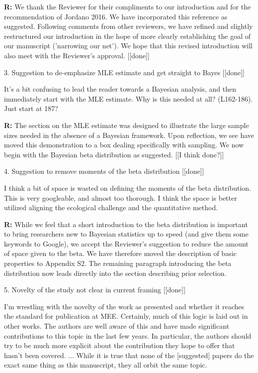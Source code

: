 \documentclass[12pt]{letter}
\newenvironment{refquote}{\bigskip \begin{it}}{\end{it}\smallskip}
\begin{document}
		\textbf{R:} We thank the Reviewer for their compliments to our introduction and for the recommendation of Jordano 2016. We have incorporated this reference as suggested. Following comments from other reviewers, we have refined and slightly restructured our introduction in the hope of more clearly establishing the goal of our manuscript ('narrowing our net'). We hope that this revised introduction will also meet with the Reviewer's approval. [[done]]


	3. Suggestion to de-emphasize MLE estimate and get straight to Bayes [[done]]

		\begin{refquote}
		It’s a bit confusing to lead the reader towards a Bayesian analysis, and then immediately start with the MLE estimate. Why is this needed at all? (L162-186). Just start at 187?
		\end{refquote}

		\textbf{R:} The section on the MLE estimate was designed to illustrate the large sample sizes needed in the absence of a Bayesian framework. Upon reflection, we see have moved this demonstration to a box dealing specifically with sampling. We now begin with the Bayesian beta distribution as suggested. [[I think done?]]


	4. Suggestion to remove moments of the beta distribution [[done]]

		\begin{refquote}
		I think a bit of space is wasted on defining the moments of the beta distribution. This is very googleable, and almost too thorough. I think the space is better utilized aligning the ecological challenge and the quantitative method.
		\end{refquote}

		\textbf{R:} While we feel that a short introduction to the beta distribution is important to bring researchers new to Bayesian statistics up to speed (and give them some keywords to Google), we accept the Reviewer's suggestion to reduce the amount of space given to the beta. We have therefore moved the description of basic properties to Appendix S2. The remaining paragraph introducing the beta distribution now leads directly into the section describing prior selection.


	5. Novelty of the study not clear in current framing [[done]]

		\begin{refquote}
		I’m wrestling with the novelty of the work as presented and whether it reaches the standard for publication at MEE. Certainly, much of this logic is laid out in other works. The authors are well aware of this and have made significant contributions to this topic in the last few years. In particular, the authors should try to be much more explicit about the contribution they hope to offer that hasn’t been covered. ...
		While it is true that none of the [suggested] papers do the exact same thing as this manuscript, they all	orbit the same topic. 
		\end{refquote}
\end{document}
